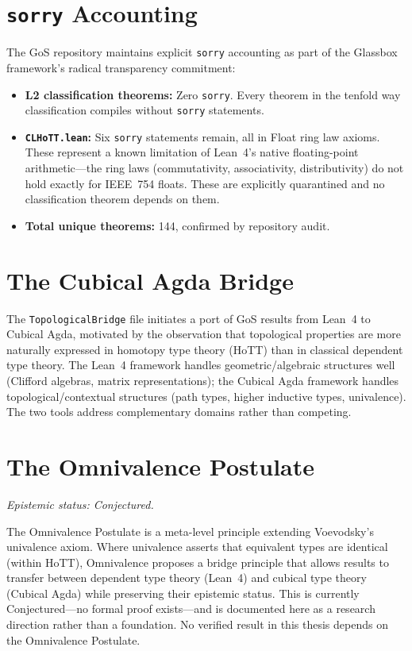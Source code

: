 \documentclass[12pt,letterpaper]{report}
\newcommand{\epistemic}[1]{%
  \par\vspace{4pt}%
  {\small\itshape\color{gray} Epistemic status: #1}%
  \par\vspace{4pt}%
}
\begin{document}
\section{\texttt{sorry} Accounting}

The GoS repository maintains explicit \texttt{sorry} accounting as part of the Glassbox framework's radical transparency commitment:

\begin{itemize}
  \item \textbf{L2 classification theorems:} Zero \texttt{sorry}. Every theorem in the tenfold way classification compiles without \texttt{sorry} statements.
  \item \textbf{\texttt{CLHoTT.lean}:} Six \texttt{sorry} statements remain, all in Float ring law axioms. These represent a known limitation of Lean~4's native floating-point arithmetic---the ring laws (commutativity, associativity, distributivity) do not hold exactly for IEEE~754 floats. These are explicitly quarantined and no classification theorem depends on them.
  \item \textbf{Total unique theorems:} 144, confirmed by repository audit.
\end{itemize}

\section{The Cubical Agda Bridge}

The \texttt{TopologicalBridge} file initiates a port of GoS results from Lean~4 to Cubical Agda, motivated by the observation that topological properties are more naturally expressed in homotopy type theory (HoTT) than in classical dependent type theory. The Lean~4 framework handles geometric/algebraic structures well (Clifford algebras, matrix representations); the Cubical Agda framework handles topological/contextual structures (path types, higher inductive types, univalence). The two tools address complementary domains rather than competing.

\section{The Omnivalence Postulate}

\epistemic{Conjectured.}

The Omnivalence Postulate is a meta-level principle extending Voevodsky's univalence axiom. Where univalence asserts that equivalent types are identical (within HoTT), Omnivalence proposes a bridge principle that allows results to transfer between dependent type theory (Lean~4) and cubical type theory (Cubical Agda) while preserving their epistemic status. This is currently Conjectured---no formal proof exists---and is documented here as a research direction rather than a foundation. No verified result in this thesis depends on the Omnivalence Postulate.
\end{document}
